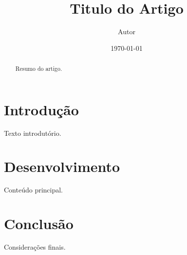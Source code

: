 \documentclass[11pt]{article}
\title{Titulo do Artigo}
\author{Autor}
\date{\today}
\begin{document}
\maketitle
\begin{abstract}
Resumo do artigo.
\end{abstract}

\section{Introdução}
Texto introdutório.

\section{Desenvolvimento}
Conteúdo principal.

\section{Conclusão}
Considerações finais.



\end{document}
